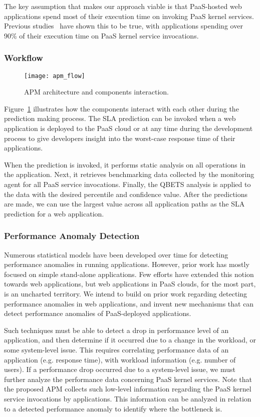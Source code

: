 The key assumption that makes our approach viable is that PaaS-hosted web applications spend most of
their execution time on invoking PaaS kernel services. 
Previous studies~\cite{Jayathilaka:2015:RTS:2806777.2806842} have shown this to be true,
with applications spending over 90\% of their execution time on PaaS kernel service invocations.

\subsubsection{Workflow}
\begin{figure}
\centering
\texttt{[image: apm\_flow]}
\caption{APM architecture and components interaction.}
\label{fig:apm_flow}
\end{figure}
Figure~\ref{fig:apm_flow} illustrates how the components interact with each other during the prediction making process.
The SLA prediction can be invoked when a web application is deployed to the PaaS cloud or at any time during the development process to give
developers insight into the worst-case response time of their applications.

When the prediction is invoked, it performs static analysis on all operations in the application. Next, it retrieves benchmarking data collected by
the monitoring agent for all PaaS service invocations. Finally, the QBETS analysis is applied to the data with the desired percentile and confidence value.
After the predictions are made, we can use the largest value across all application paths as the SLA prediction for a web application.

\subsubsection{Performance Anomaly Detection}
Numerous statistical models have been developed over time for detecting performance anomalies in running
applications. However, prior work has mostly focused on simple stand-alone applications. Few efforts have
extended this notion towards web applications, but web applications in PaaS clouds, for the most part,
is an uncharted territory. We intend to build on prior work regarding detecting performance anomalies in
web applications, and invent new mechanisms that can detect performance anomalies of PaaS-deployed
applications.

Such techniques must be able to detect a drop in performance level of an application, and then
determine if it occurred due to a change in the workload, or some system-level issue. This requires
correlating performance data of an application (e.g. response time), with workload information (e.g. number
of users). If a performance drop
occurred due to a system-level issue, we must further analyze the performance data concerning
PaaS kernel services. Note that the proposed APM collects such low-level information regarding
the PaaS kernel service invocations by applications. This information can be analyzed in relation 
to a detected performance anomaly to identify where the bottleneck is.

